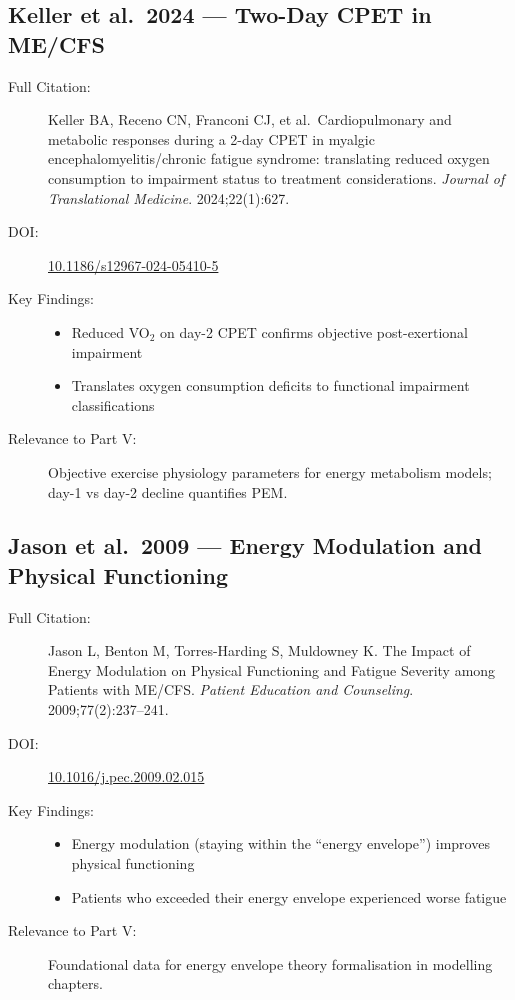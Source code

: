 \subsection{Keller et al.\ 2024 --- Two-Day CPET in ME/CFS}

\begin{description}
    \item[Full Citation:] Keller BA, Receno CN, Franconi CJ, et al.\ Cardiopulmonary and metabolic responses during a 2-day CPET in myalgic encephalomyelitis/chronic fatigue syndrome: translating reduced oxygen consumption to impairment status to treatment considerations. \textit{Journal of Translational Medicine}. 2024;22(1):627. \cite{keller2024cpet}
    \item[DOI:] \href{https://doi.org/10.1186/s12967-024-05410-5}{10.1186/s12967-024-05410-5}
    \item[Key Findings:]
    \begin{itemize}
        \item Reduced VO$_2$ on day-2 CPET confirms objective post-exertional impairment
        \item Translates oxygen consumption deficits to functional impairment classifications
    \end{itemize}
    \item[Relevance to Part V:] Objective exercise physiology parameters for energy metabolism models; day-1 vs day-2 decline quantifies PEM.
\end{description}

\subsection{Jason et al.\ 2009 --- Energy Modulation and Physical Functioning}

\begin{description}
    \item[Full Citation:] Jason L, Benton M, Torres-Harding S, Muldowney K. The Impact of Energy Modulation on Physical Functioning and Fatigue Severity among Patients with ME/CFS. \textit{Patient Education and Counseling}. 2009;77(2):237--241. \cite{jason2009energy}
    \item[DOI:] \href{https://doi.org/10.1016/j.pec.2009.02.015}{10.1016/j.pec.2009.02.015}
    \item[Key Findings:]
    \begin{itemize}
        \item Energy modulation (staying within the ``energy envelope'') improves physical functioning
        \item Patients who exceeded their energy envelope experienced worse fatigue
    \end{itemize}
    \item[Relevance to Part V:] Foundational data for energy envelope theory formalisation in modelling chapters.
\end{description}

